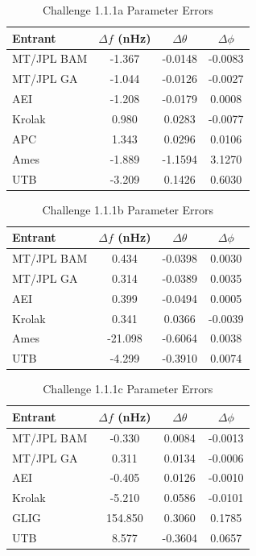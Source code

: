 \documentclass[11pt]{article}
\begin{document}
\begin{table}[t]
\caption{\label{Challenge1.1.1a_p}Challenge 1.1.1a Parameter Errors}
\begin{center}
\begin{tabular}{|l|c|c|c|}
\hline
Entrant  & $\Delta f$ (nHz) & $\Delta \theta$ & $\Delta \phi$ \\
 \hline
MT/JPL BAM & -1.367 & -0.0148 &  -0.0083 \\
MT/JPL GA  & -1.044 & -0.0126 & -0.0027 \\
AEI        & -1.208 & -0.0179 & 0.0008   \\
Krolak     &  0.980 &  0.0283 & -0.0077 \\
APC        &  1.343 &  0.0296 & 0.0106 \\
Ames       & -1.889 & -1.1594 & 3.1270 \\
UTB        & -3.209 &  0.1426 & 0.6030 \\
\hline  
\end{tabular}
\end{center}
\end{table}


\begin{table}[t]
\caption{\label{Challenge1.1.1b_p}Challenge 1.1.1b Parameter Errors}
\begin{center}
\begin{tabular}{|l|c|c|c|}
\hline
Entrant  & $\Delta f$ (nHz) & $\Delta \theta$ & $\Delta \phi$ \\
 \hline
MT/JPL BAM & 0.434 & -0.0398 &  0.0030 \\
MT/JPL GA  & 0.314 & -0.0389 &  0.0035 \\
AEI        & 0.399 & -0.0494 &  0.0005 \\
Krolak     & 0.341 &  0.0366 & -0.0039 \\
Ames       & -21.098 &  -0.6064 &  0.0038 \\
UTB        & -4.299 & -0.3910 & 0.0074 \\
\hline  
\end{tabular}
\end{center}
\end{table}


\begin{table}[t]
\caption{\label{Challenge1.1.1c_p}Challenge 1.1.1c Parameter Errors}
\begin{center}
\begin{tabular}{|l|c|c|c|}
\hline
Entrant  & $\Delta f$ (nHz) & $\Delta \theta$ & $\Delta \phi$ \\
 \hline
MT/JPL BAM & -0.330 & 0.0084 & -0.0013 \\
MT/JPL GA  &  0.311 & 0.0134 & -0.0006 \\
AEI        & -0.405 & 0.0126 & -0.0010 \\
Krolak     & -5.210 & 0.0586 & -0.0101 \\
GLIG       &  154.850 &  0.3060 & 0.1785 \\
UTB        & 8.577 & -0.3604 & 0.0657 \\
\hline  
\end{tabular}
\end{center}
\end{table}
\end{document}
